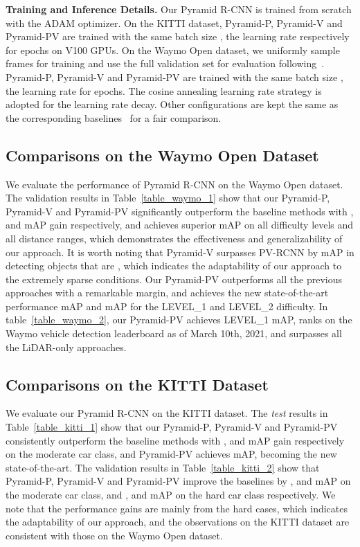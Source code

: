 \documentclass[10pt,twocolumn,letterpaper]{article}
\begin{document}
\noindent\textbf{Training and Inference Details.} Our Pyramid R-CNN is trained from scratch with the ADAM optimizer. On the KITTI dataset, Pyramid-P, Pyramid-V and Pyramid-PV are trained with the same batch size , the learning rate  respectively for  epochs on  V100 GPUs. On the Waymo Open dataset, we uniformly sample  frames for training and use the full validation set for evaluation following~\cite{shi2020pv}. Pyramid-P, Pyramid-V and Pyramid-PV are trained with the same batch size , the learning rate  for  epochs. The cosine annealing learning rate strategy is adopted for the learning rate decay. Other configurations are kept the same as the corresponding baselines~\cite{shi2019pointrcnn, shi2020points, shi2020pv} for a fair comparison.

\vspace{-1mm}
\subsection{Comparisons on the Waymo Open Dataset} \label{3D Detection on the Waymo Open Dataset}
\vspace{-1mm}

We evaluate the performance of Pyramid R-CNN on the Waymo Open dataset. The validation results in Table~\ref{table_waymo_1} show that our Pyramid-P, Pyramid-V and Pyramid-PV significantly outperform the baseline methods with ,  and  mAP gain respectively, and achieves superior mAP on all difficulty levels and all distance ranges, which demonstrates the effectiveness and generalizability of our approach. It is worth noting that Pyramid-V surpasses PV-RCNN by  mAP in detecting objects that are , which indicates the adaptability of our approach to the extremely sparse conditions. Our Pyramid-PV outperforms all the previous approaches with a remarkable margin, and achieves the new state-of-the-art performance  mAP and  mAP for the LEVEL\_1 and LEVEL\_2 difficulty. In table~\ref{table_waymo_2}, our Pyramid-PV achieves  LEVEL\_1 mAP, ranks  on the Waymo vehicle detection leaderboard as of March 10th, 2021, and surpasses all the LiDAR-only approaches.

\subsection{Comparisons on the KITTI Dataset} \label{3D Detection on the KITTI Dataset}
We evaluate our Pyramid R-CNN on the KITTI dataset. The \textit{test} results in Table~\ref{table_kitti_1} show that our Pyramid-P, Pyramid-V and Pyramid-PV consistently outperform the baseline methods with ,  and  mAP gain respectively on the moderate car class, and Pyramid-PV achieves  mAP, becoming the new state-of-the-art. The validation results in Table~\ref{table_kitti_2} show that Pyramid-P, Pyramid-V and Pyramid-PV improve the baselines by ,  and  mAP on the moderate car class, and ,  and  mAP on the hard car class respectively. We note that the performance gains are mainly from the hard cases, which indicates the adaptability of our approach, and the observations on the KITTI dataset are consistent with those on the Waymo Open dataset. 
\end{document}
